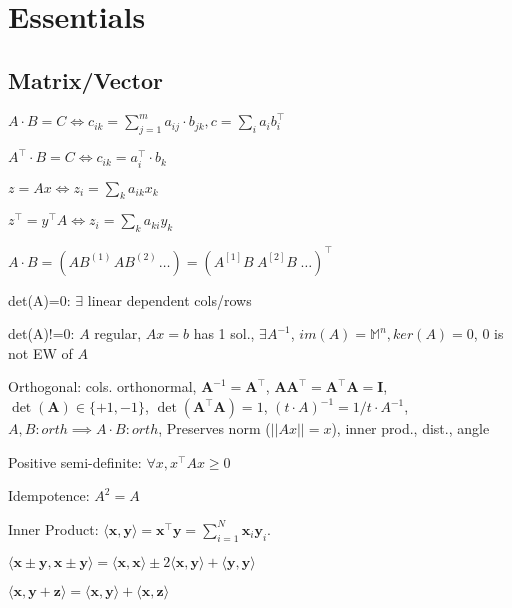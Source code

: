 \section{Essentials}
\subsection*{Matrix/Vector}
\begin{compactdesc}
	\item $A\cdot B = C \Leftrightarrow c_{ik}=\sum_{j=1}^{m} a_{ij} \cdot b_{jk}, c=\sum_{i} a_i b_i^\top$
	\item $A^\top\cdot B = C \Leftrightarrow c_{ik}=a_i^\top \cdot b_k$
	\item $z=Ax\Leftrightarrow z_i=\sum_k a_{ik} x_k$
	\item $z^\top = y^\top A \Leftrightarrow z_i = \sum_k a_{ki} y_k$
	\item $A\cdot B=(A B^{(1)}\hspace{1pt} AB^{(2)}\hspace{1pt} \dots)=(A^{[1]}B\hspace{3pt}A^{[2]}B\hspace{3pt}\dots)^\top$
	\item[det(A)=0:] $\exists$ linear dependent cols/rows
	\item[det(A)!=0:] $A$ regular, $Ax=b$ has 1 sol., $\exists A^{-1}$, $im(A)=\mathbb{M}^n, ker(A)=0$, 0 is not EW of $A$
	\item[Orthogonal:] cols. orthonormal, $\mathbf{A}^{-1} = \mathbf{A}^\top$, $\mathbf{A} \mathbf{A}^\top = \mathbf{A}^\top \mathbf{A} = \mathbf{I}$, $\operatorname{det}(\mathbf{A}) \in \{+1, -1\}$, $\operatorname{det}(\mathbf{A}^\top \mathbf{A}) = 1$, $(t\cdot A)^{-1}=1/t\cdot A^{-1}$, $A, B: orth \implies A\cdot B: orth$, Preserves norm ($||Ax||=x$), inner prod., dist., angle
	\item[Positive semi-definite:] $\forall x, x^\top A x \geq 0$
	\item[Idempotence:] $A^2 = A$
	\item[Inner Product:] $\langle \mathbf{x}, \mathbf{y} \rangle = \mathbf{x}^\top \mathbf{y} = \sum_{i=1}^{N} \mathbf{x}_i \mathbf{y}_i$.
	\begin{inparaitem}
		\item $\langle \mathbf{x} \pm \mathbf{y}, \mathbf{x} \pm \mathbf{y} \rangle = \langle \mathbf{x}, \mathbf{x} \rangle \pm 2 \langle \mathbf{x}, \mathbf{y} \rangle + \langle \mathbf{y}, \mathbf{y} \rangle$
		\item $\langle \mathbf{x}, \mathbf{y} + \mathbf{z} \rangle = \langle \mathbf{x}, \mathbf{y} \rangle + \langle \mathbf{x}, \mathbf{z} \rangle$

\end{inparaitem}
\end{compactdesc}
